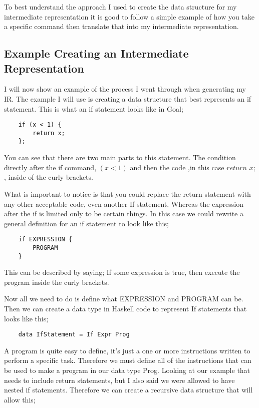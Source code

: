 To best understand the approach I used to create the data structure for my intermediate representation it is good to follow a simple example of how you take a specific command then translate that into my intermediate representation.

\subsection{Example Creating an Intermediate Representation}

I will now show an example of the process I went through when generating my IR. The example I will use is creating a data structure that best represents an if statement. This is what an if statement looks like in Goal;

\begin{lstlisting}
	if (x < 1) {
		return x;
	};
\end{lstlisting}

You can see that there are two main parts to this statement. The condition directly after the if command,  $(x < 1)$  and then the code ,in this case $return$ $x;$, inside of the curly brackets. 

What is important to notice is that you could replace the return statement with any other acceptable code, even another If statement. Whereas the expression after the if is limited only to be certain things. In this case we could rewrite a general definition for an if statement to look like this;

\begin{lstlisting}
	if EXPRESSION {
		PROGRAM 
	}
\end{lstlisting}

This can be described by saying; If some expression is true, then execute the program inside the curly brackets.
 
Now all we need to do is define what  EXPRESSION and PROGRAM can be. Then we can create a data type in Haskell code to represent If statements that looks like this;

\begin{lstlisting}
	data IfStatement = If Expr Prog 
\end{lstlisting}

A program is quite easy to define, it's just a one or more instructions written to perform a specific task\footnotemark[2]. Therefore we must define all of the instructions that can be used to make a program in our data type Prog. Looking at our example that needs to include return statements, but I also said we were allowed to have nested if statements. Therefore we can create a recursive data structure that will allow this;

